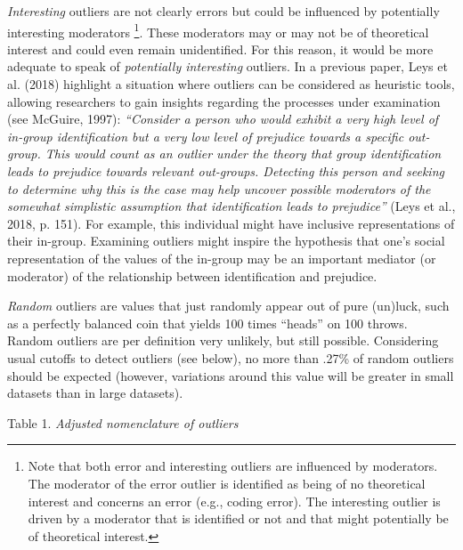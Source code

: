 \documentclass[man,floatsintext]{apa6}
\let\rmarkdownfootnote\footnote%
\def\footnote{\protect\rmarkdownfootnote}
\begin{document}
\emph{Interesting} outliers are not clearly errors but could be influenced by potentially interesting moderators \footnote{Note that both error and interesting outliers are influenced by moderators. The moderator of the error outlier is identified as being of no theoretical interest and concerns an error (e.g., coding error). The interesting outlier is driven by a moderator that is identified or not and that might potentially be of theoretical interest.}. These moderators may or may not be of theoretical interest and could even remain unidentified. For this reason, it would be more adequate to speak of \emph{potentially interesting} outliers. In a previous paper, Leys et al. (2018) highlight a situation where outliers can be considered as heuristic tools, allowing researchers to gain insights regarding the processes under examination (see McGuire, 1997): \emph{\enquote{Consider a person who would exhibit a very high level of in-group identification but a very low level of prejudice towards a specific out-group. This would count as an outlier under the theory that group identification leads to prejudice towards relevant out-groups. Detecting this person and seeking to determine why this is the case may help uncover possible moderators of the somewhat simplistic assumption that identification leads to prejudice}} (Leys et al., 2018, p. 151). For example, this individual might have inclusive representations of their in-group. Examining outliers might inspire the hypothesis that one's social representation of the values of the in-group may be an important mediator (or moderator) of the relationship between identification and prejudice.

\emph{Random} outliers are values that just randomly appear out of pure (un)luck, such as a perfectly balanced coin that yields 100 times \enquote{heads} on 100 throws. Random outliers are per definition very unlikely, but still possible. Considering usual cutoffs to detect outliers (see below), no more than .27\% of random outliers should be expected (however, variations around this value will be greater in small datasets than in large datasets).

Table 1.
\emph{Adjusted nomenclature of outliers}
\end{document}
